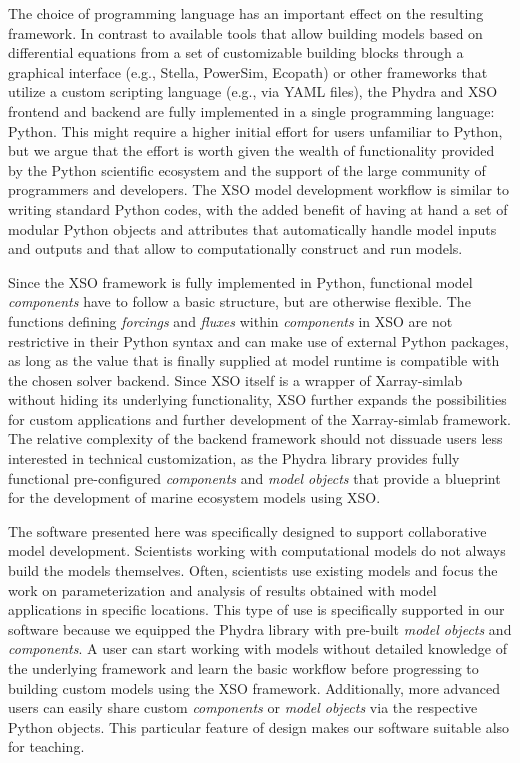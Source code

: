 \documentclass[gmd, manuscript]{copernicus}
\begin{document}
The choice of programming language has an important effect on the resulting framework. In contrast to available tools that allow building models based on differential equations from a set of customizable building blocks through a graphical interface (e.g., Stella, PowerSim, Ecopath) or other frameworks that utilize a custom scripting language (e.g., via YAML files), the Phydra and XSO frontend and backend are fully implemented in a single programming language: Python. This might require a higher initial effort for users unfamiliar to Python, but we argue that the effort is worth given the wealth of functionality provided by the Python scientific ecosystem and the support of the large community of programmers and developers. The XSO model development workflow is similar to writing standard Python codes, with the added benefit of having at hand a set of modular Python objects and attributes that automatically handle model inputs and outputs and that allow to computationally construct and run models. 

Since the XSO framework is fully implemented in Python, functional model \textit{components} have to follow a basic structure, but are otherwise flexible. The functions defining \textit{forcings} and \textit{fluxes} within \textit{components} in XSO are not restrictive in their Python syntax and can make use of external Python packages, as long as the value that is finally supplied at model runtime is compatible with the chosen solver backend. Since XSO itself is a wrapper of Xarray-simlab without hiding its underlying functionality, XSO further expands the possibilities for custom applications and further development of the Xarray-simlab framework. The relative complexity of the backend framework should not dissuade users less interested in technical customization, as the Phydra library provides fully functional pre-configured \textit{components} and \textit{model objects} that provide a blueprint for the development of marine ecosystem models using XSO. 


The software presented here was specifically designed to support collaborative model development. Scientists working with computational models do not always build the models themselves. Often, scientists use existing models and focus the work on parameterization and analysis of results obtained with model applications in specific locations. This type of use is specifically supported in our software because we equipped the Phydra library with pre-built \textit{model objects} and \textit{components}. A user can start working with models without detailed knowledge of the underlying framework and learn the basic workflow before progressing to building custom models using the XSO framework. Additionally, more advanced users can easily share custom \textit{components} or \textit{model objects} via the respective Python objects. This particular feature of design makes our software suitable also for teaching. 
\end{document}
